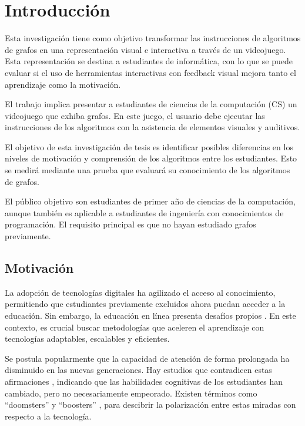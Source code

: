 \chapter{Introducción}

Esta investigación tiene como objetivo transformar las instrucciones de algoritmos de grafos en una representación visual e interactiva a través de un videojuego. Esta representación se destina a estudiantes de informática, con lo que se puede evaluar si el uso de herramientas interactivas con feedback visual mejora tanto el aprendizaje como la motivación.

El trabajo implica presentar a estudiantes de ciencias de la computación (CS) un videojuego que exhiba grafos. En este juego, el usuario debe ejecutar las instrucciones de los algoritmos con la asistencia de elementos visuales y auditivos.

El objetivo de esta investigación de tesis es identificar posibles diferencias en los niveles de motivación y comprensión de los algoritmos entre los estudiantes. Esto se medirá mediante una prueba que evaluará su conocimiento de los algoritmos de grafos.

El público objetivo son estudiantes de primer año de ciencias de la computación, aunque también es aplicable a estudiantes de ingeniería con conocimientos de programación. El requisito principal es que no hayan estudiado grafos previamente.

\section{Motivación}

La adopción de tecnologías digitales ha agilizado el acceso al conocimiento, permitiendo que estudiantes previamente excluidos ahora puedan acceder a la educación. Sin embargo, la educación en línea presenta desafíos propios \cite{UN2023ImpactDigitalTechnologies}. En este contexto, es crucial buscar metodologías que aceleren el aprendizaje con tecnologías adaptables, escalables y eficientes.

Se postula popularmente que la capacidad de atención de forma prolongada ha disminuido en las nuevas generaciones. Hay estudios que contradicen estas afirmaciones \cite{The_Role_of_Attention_Learning_Digital_Age}, indicando que las habilidades cognitivas de los estudiantes han cambiado, pero no necesariamente empeorado. Existen términos como ``doomsters'' y ``boosters'' \cite{Selwyn2014LookingF}, para descibrir la polarización entre estas miradas con respecto a la tecnología.

